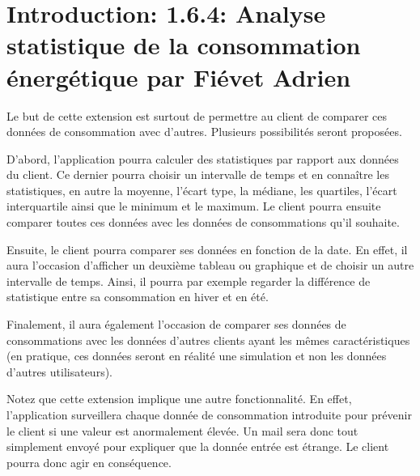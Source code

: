 \section{Introduction: 1.6.4: Analyse statistique de la consommation énergétique par Fiévet Adrien}

\begin{flushleft}
Le but de cette extension est surtout de permettre au client de comparer ces données de consommation avec d'autres. Plusieurs possibilités seront proposées.
\end{flushleft}

\begin{flushleft}
D'abord, l'application pourra calculer des statistiques par rapport aux données du client. Ce dernier pourra choisir un intervalle de temps et en connaître les statistiques, en autre la moyenne, l'écart type, la médiane, les quartiles, l'écart interquartile ainsi que le minimum et le maximum. Le client pourra ensuite comparer toutes ces données avec les données de consommations qu'il souhaite.
\end{flushleft}

\begin{flushleft}
Ensuite, le client pourra comparer ses données en fonction de la date. En effet, il aura l'occasion d'afficher un deuxième tableau ou graphique et de choisir un autre intervalle de temps. Ainsi, il pourra par exemple regarder la différence de statistique entre sa consommation en hiver et en été.
\end{flushleft}

\begin{flushleft}
Finalement, il aura également l'occasion de comparer ses données de consommations avec les données d'autres clients ayant les mêmes caractéristiques (en pratique, ces données seront en réalité une simulation et non les données d'autres utilisateurs).
\end{flushleft}

\begin{flushleft}
Notez que cette extension implique une autre fonctionnalité. En effet, l'application surveillera chaque donnée de consommation introduite pour prévenir le client si une valeur est anormalement élevée. Un mail sera donc tout simplement envoyé pour expliquer que la donnée entrée est étrange. Le client pourra donc agir en conséquence.
\end{flushleft}
